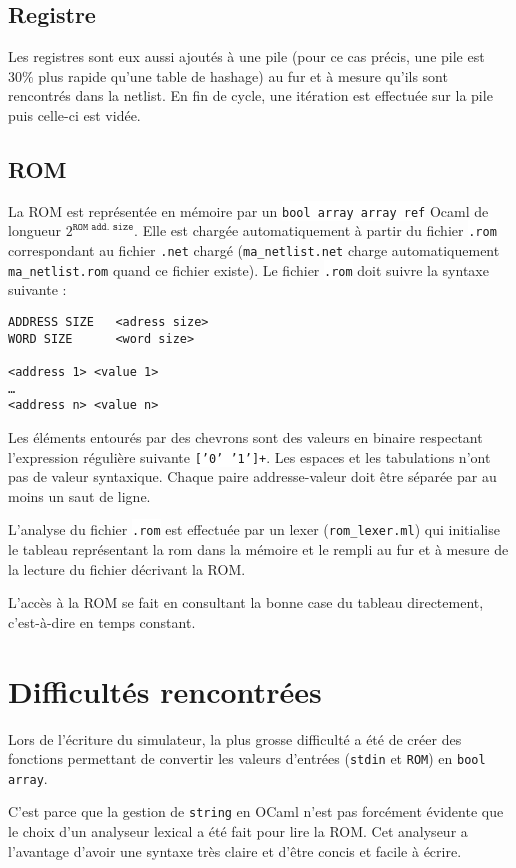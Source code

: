 \documentclass{article}
\newcommand{\code}[1]{\colorbox{White}{\texttt{#1}}}
\begin{document}
\subsection{Registre}
\label{sec:registre}

Les registres sont eux aussi ajoutés à une pile (pour ce cas précis,
une pile est $30\%$ plus rapide qu'une table de hashage) au fur et à
mesure qu'ils sont rencontrés dans la netlist. En fin de cycle, une
itération est effectuée sur la pile puis celle-ci est vidée.

\subsection{ROM}
\label{sec:rom}

La ROM est représentée en mémoire par un \code{bool array array ref}
Ocaml de longueur $2^\texttt{ROM add. size}$. Elle est
chargée automatiquement à partir du fichier \code{.rom} correspondant
au fichier \code{.net} chargé (\texttt{ma\_netlist.net} charge automatiquement
\texttt{ma\_netlist.rom} quand ce fichier existe). Le fichier
\code{.rom} doit suivre la syntaxe suivante :
\begin{verbatim}
ADDRESS SIZE   <adress size>
WORD SIZE      <word size>

<address 1> <value 1>
…
<address n> <value n>
\end{verbatim}
Les éléments entourés par des chevrons sont des valeurs en
binaire respectant l'expression régulière suivante \code{['0' '1']+}. Les espaces et les tabulations n'ont pas de valeur
syntaxique. Chaque paire addresse-valeur doit être séparée par au
moins un saut de ligne.

L'analyse du fichier \code{.rom} est effectuée par un lexer
(\texttt{rom\_lexer.ml}) qui initialise le tableau représentant la rom
dans la mémoire et le rempli au fur et à mesure de la lecture du
fichier décrivant la ROM.

L'accès à la ROM se fait en consultant la bonne case du tableau
directement, c'est-à-dire en temps constant.

\section{Difficultés rencontrées}

Lors de l'écriture du simulateur, la plus grosse difficulté a été de
créer des fonctions permettant de convertir les valeurs d'entrées
(\texttt{stdin} et \texttt{ROM}) en \texttt{bool array}.

C'est parce que la gestion de \texttt{string} en OCaml n'est pas
forcément évidente que le choix d'un analyseur lexical a été fait pour
lire la ROM. Cet analyseur a l'avantage d'avoir une syntaxe très
claire et d'être concis et facile à écrire.
\end{document}
